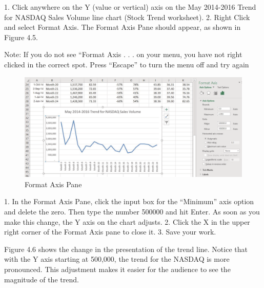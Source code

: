 1. Click anywhere on the Y (value or vertical) axis on the May 2014-2016 Trend for NASDAQ
Sales Volume line chart (Stock Trend worksheet).
2. Right Click and select Format Axis. The Format Axis Pane should appear, as shown in Figure
4.5.




Note: If you do not see “Format Axis . . . on your menu, you have not right clicked in the correct spot.
Press “Escape” to turn the menu off and try again


\begin{figure}[H]
	\centering
	\includegraphics[width=\maxwidth{.95\linewidth}]{gfx/ch04_fig07}
	\caption{Format Axis Pane}
	\label{04:fig07}
\end{figure}






1. In the Format Axis Pane, click the input box for the “Minimum” axis option and delete the zero.
Then type the number 500000 and hit Enter. As soon as you make this change, the Y axis on the
chart adjusts.
2. Click the X in the upper right corner of the Format Axis pane to close it.
3. Save your work.

Figure 4.6 shows the change in the presentation of the trend line. Notice that with the Y axis starting
at 500,000, the trend for the NASDAQ is more pronounced. This adjustment makes it easier for the
audience to see the magnitude of the trend.



